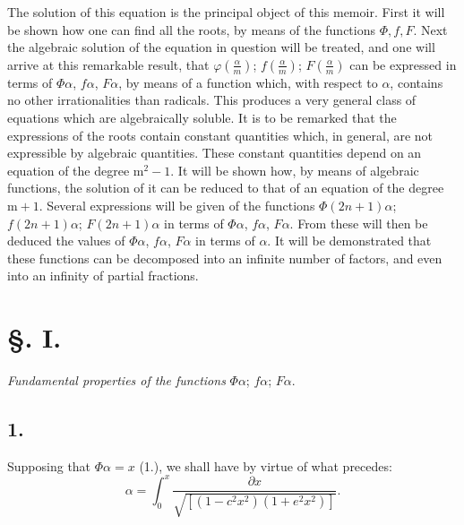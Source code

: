\documentclass{article}
\begin{document}
The solution of this equation is the principal object of this memoir. First it will be shown how one can find all the roots, by means of the functions $\Phi,f,F$. Next the algebraic solution of the equation in question will be treated, and one will arrive at this remarkable result, that $\varphi\left(\frac{\alpha}{m}\right)$; $f\left(\frac{\alpha}{m}\right)$; $F\left(\frac{\alpha}{m}\right)$ can be expressed in terms of $\Phi\alpha$, $f\alpha$, $F\alpha$, by means of a function which, with respect to $\alpha$, contains no other irrationalities than radicals. This produces a very general class of equations which are algebraically soluble. It is to be remarked that the expressions of the roots contain constant quantities which, in general, are not expressible by algebraic quantities. These constant quantities depend on an equation of the degree $\mathrm{m}^{2}-1$. It will be shown how, by means of algebraic functions, the solution of it can be reduced to that of an equation of the degree $\mathrm{m}+1$. Several expressions will be given of the functions $\Phi(2n+1)\alpha$; $f(2n+1)\alpha$; $F(2n+1)\alpha$ in terms of $\Phi\alpha$, $f\alpha$, $F\alpha$. From these will then be deduced the values of $\Phi\alpha$, $f\alpha$, $F\alpha$ in terms of $\alpha$. It will be demonstrated that these functions can be decomposed into an infinite number of factors, and even into an infinity of partial fractions.

\section*{§. I.}

\emph{Fundamental properties of the functions} $\Phi\alpha$; $f\alpha$; $F\alpha$.

\subsection*{1.}

Supposing that $\Phi\alpha=x$ (1.), we shall have by virtue of what precedes:
\[ \alpha=\int_{0}^{x}\frac{\partial x}{\sqrt{[(1-c^{2}x^{2})(1+e^{2}x^{2})]}}. \tag{2.} \]
\end{document}
